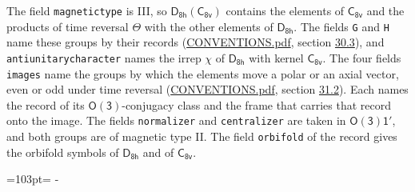 \documentclass[10pt,a4paper]{article}
\newcommand{\needspace}[1]{\par\penalty-100\begingroup\dimen0=#1\relax\dimen2=\pagegoal
  \advance\dimen2-\pagetotal\ifdim\dimen0>\dimen2\relax\ifdim\dimen2>0pt\vfil\break\fi\fi
  \endgroup}
\numberwithin{equation}{section}
\newcommand{\grp}[1]{\mathsf{#1}}
\begin{document}
The field \texttt{magnetictype} is III, so $\grp{D_{8h}}(\grp{C_{8v}})$ contains the elements of $\grp{C_{8v}}$ and the products of time reversal $\varTheta$ with the other elements of $\grp{D_{8h}}$. The fields \texttt{G} and \texttt{H} name these groups by their records (\href{../../CONVENTIONS.pdf}{CONVENTIONS.pdf}, section \href{../../CONVENTIONS.pdf\#conv.30.3}{30.3}), and \texttt{antiunitarycharacter} names the irrep $\chi$ of $\grp{D_{8h}}$ with kernel $\grp{C_{8v}}$. The four fields \texttt{images} name the groups by which the elements move a polar or an axial vector, even or odd under time reversal (\href{../../CONVENTIONS.pdf}{CONVENTIONS.pdf}, section \href{../../CONVENTIONS.pdf\#conv.31.2}{31.2}). Each names the record of its $\grp{O(3)}$-conjugacy class and the frame that carries that record onto the image. The fields \texttt{normalizer} and \texttt{centralizer} are taken in $\grp{O(3)1'}$, and both groups are of magnetic type II. The field \texttt{orbifold} of the record gives the orbifold symbols of $\grp{D_{8h}}$ and of $\grp{C_{8v}}$.
\needspace{103pt}
\end{document}

